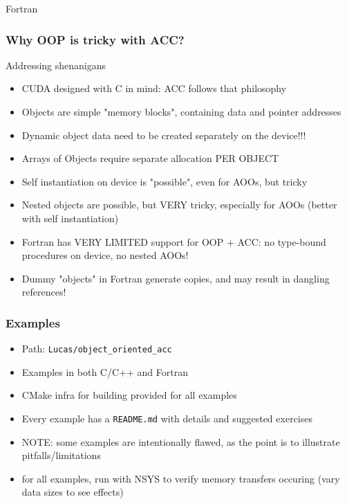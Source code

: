 \begin{frame}
        \begin{block}{Fortran}
            
        \end{block}
\end{frame}

\begin{frame}
    \frametitle{Why OOP is tricky with ACC?}
    \begin{alertblock}{Addressing shenanigans}
        \begin{itemize}
            \item CUDA designed with C in mind: ACC follows that philosophy
            \item Objects are simple "memory blocks", containing data and pointer addresses
            \item Dynamic object data need to be created separately on the device!!!
            \item Arrays of Objects require separate allocation PER OBJECT
            \item Self instantiation on device is "possible", even for AOOs, but tricky
            \item Nested objects are possible, but VERY tricky, especially for AOOs (better with self instantiation)
            \item Fortran has VERY LIMITED support for OOP + ACC: no type-bound procedures on device, no nested AOOs!
            \item Dummy "objects" in Fortran generate copies, and may result in dangling references!
        \end{itemize}
    \end{alertblock}
\end{frame}

\begin{frame}
	\frametitle{Examples}
    \begin{itemize}
        \item Path: \texttt{Lucas/object\_oriented\_acc}
        \item Examples in both C/C++ and Fortran
        \item CMake infra for building provided for all examples
        \item Every example has a \texttt{README.md} with details and suggested exercises
        \item NOTE: some examples are intentionally flawed, as the point is to illustrate pitfalls/limitations
        \item for all examples, run with NSYS to verify memory transfers occuring (vary data sizes to see effects)
    \end{itemize}
\end{frame}

